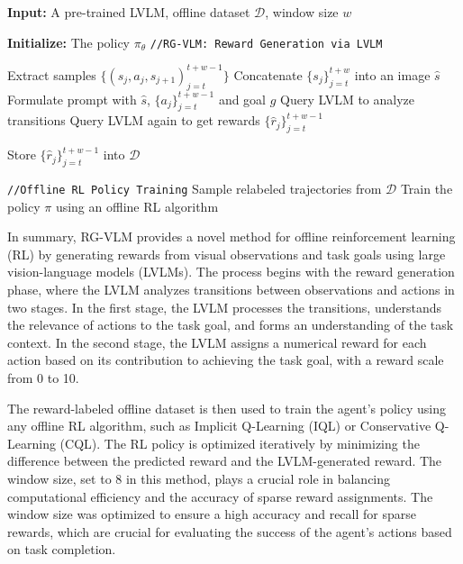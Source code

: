 \documentclass[master,english,final]{kaist-ucs}
\begin{document}
\begin{algorithm}[h]
\small
\caption{RG-VLM: LVLM Reward Generation and Offline RL Training}\label{alg:dr_vlm} 
\begin{algorithmic}[1]
    \STATE \textbf{Input:} A pre-trained LVLM, offline dataset $\mathcal{D}$, window size $w$

    \STATE \textbf{Initialize:} The policy $\pi_{\theta}$
    \STATE \texttt{//RG-VLM: Reward Generation via LVLM}

            \STATE Extract samples $\{(s_j, a_j, s_{j+1})_{j=t}^{t+w-1}\}$
            \STATE Concatenate $\{s_j\}_{j=t}^{t+w}$ into an image $\hat{s}$
            \STATE Formulate prompt with $\hat{s}$, $\{a_j\}_{j=t}^{t+w-1}$ and goal $g$
            \STATE Query LVLM to analyze transitions 
            \STATE Query LVLM again to get rewards $\{\hat{r}_j\}_{j=t}^{t+w-1}$

            \STATE Store $\{\hat{r}_j\}_{j=t}^{t+w-1}$ into $\mathcal{D}$
        \ENDFOR
    \ENDFOR

    \STATE \texttt{//Offline RL Policy Training}
        \STATE Sample relabeled trajectories from $\mathcal{D}$
        \STATE Train the policy $\pi$ using an offline RL algorithm 
    \ENDWHILE
\end{algorithmic}
\end{algorithm}
\setlength{\textfloatsep}{0.1in}
In summary, RG-VLM provides a novel method for offline reinforcement learning (RL) by generating rewards from visual observations and task goals using large vision-language models (LVLMs). The process begins with the reward generation phase, where the LVLM analyzes transitions between observations and actions in two stages. In the first stage, the LVLM processes the transitions, understands the relevance of actions to the task goal, and forms an understanding of the task context. In the second stage, the LVLM assigns a numerical reward for each action based on its contribution to achieving the task goal, with a reward scale from 0 to 10.

The reward-labeled offline dataset is then used to train the agent’s policy using any offline RL algorithm, such as Implicit Q-Learning (IQL)\cite{kostrikov2021offline} or Conservative Q-Learning (CQL)\cite{kumar2020conservative}. The RL policy is optimized iteratively by minimizing the difference between the predicted reward and the LVLM-generated reward. The window size, set to 8 in this method, plays a crucial role in balancing computational efficiency and the accuracy of sparse reward assignments. The window size was optimized to ensure a high accuracy and recall for sparse rewards, which are crucial for evaluating the success of the agent’s actions based on task completion.
\end{document}
